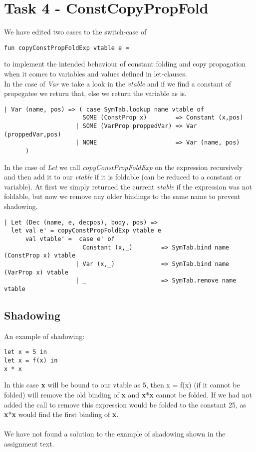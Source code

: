 \documentclass{article}
\begin{document}
\section{Task 4 - ConstCopyPropFold}
We have edited two cases to the switch-case of 
\begin{lstlisting}
fun copyConstPropFoldExp vtable e =
\end{lstlisting}
to implement the intended behaviour of constant folding and copy propagation when it comes to variables and values defined in let-clauses.\\
In the case of \textit{Var} we take a look in the \textit{vtable} and if we find a constant of propegatee we return that, else we return the variable as is.\\
\begin{lstlisting}
| Var (name, pos) => ( case SymTab.lookup name vtable of
                      SOME (ConstProp x)        => Constant (x,pos) 
                    | SOME (VarProp proppedVar) => Var (proppedVar,pos)
                    | NONE                      => Var (name, pos)
      )
\end{lstlisting}

\noindent In the case of \textit{Let} we call \textit{copyConstPropFoldExp} on the expression recursively and then add it to our \textit{vtable} if it is foldable (can be reduced to a constant or variable). At first we simply returned the current \textit{vtable} if the expression was not foldable, but now we remove any older bindings to the same name to prevent shadowing.

\begin{lstlisting}
| Let (Dec (name, e, decpos), body, pos) => 
  let val e' = copyConstPropFoldExp vtable e
      val vtable' =  case e' of
                      Constant (x,_)        => SymTab.bind name (ConstProp x) vtable 
                    | Var (x,_)             => SymTab.bind name (VarProp x) vtable
                    | _                     => SymTab.remove name vtable
\end{lstlisting}

\subsection{Shadowing}
\noindent An example of shadowing:

\begin{lstlisting}
let x = 5 in
let x = f(x) in
x * x
\end{lstlisting}

\noindent In this case \textbf{x} will be bound to our vtable as 5, then x = f(x) (if it cannot be folded) will remove the old binding of \textbf{x} and \textbf{x}*\textbf{x} cannot be folded. If we had not added the call to remove this expression would be folded to the constant 25, as \textbf{x}*\textbf{x} would find the first binding of \textbf{x}.\\
\\
We have not found a solution to the example of shadowing shown in the assignment text.
\end{document}
